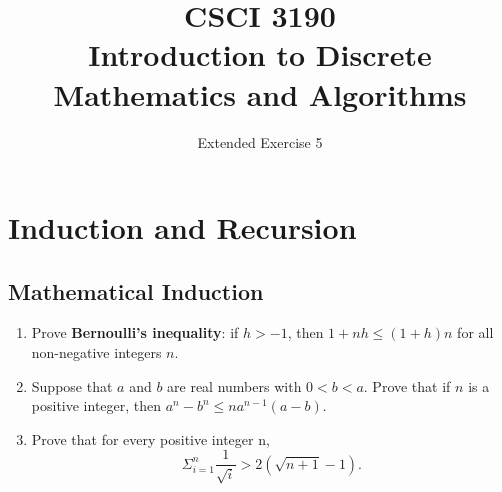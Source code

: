 \documentclass{../../cls/sig-alternate-05-2015}
\begin{document}






%

\title{CSCI 3190 \\ Introduction to Discrete Mathematics and Algorithms}
\subtitle{Extended Exercise 5}

\maketitle
\begin{abstract}

\end{abstract}

\keywords{}

\section{Induction and Recursion}
\subsection{Mathematical Induction}
\begin{enumerate}
\item Prove \textbf{Bernoulli’s inequality}: if $h > -1$, then $1+nh \le (1+h)n$ for all non-negative integers $n$.

\item Suppose that $a$ and $b$ are real numbers with $0 < b < a$.
Prove that if $n$ is a positive integer, then $a^n - b^n \le na^{n - 1}(a - b)$.

\item Prove that for every positive integer n, \begin{equation}
	\Sigma_{i = 1}^n \frac{1}{\sqrt{i}} > 2(\sqrt{n + 1} - 1).
\end{equation}
\end{enumerate}
\end{document}
